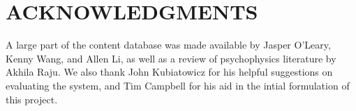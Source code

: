 \documentclass{sigchi}
\begin{document}
  \section{ACKNOWLEDGMENTS}
  A large part of the content database was made available by Jasper O'Leary, Kenny Wang, and Allen Li, as well as a review of psychophysics literature by Akhila Raju. We also thank John Kubiatowicz for his helpful suggestions on evaluating the system, and Tim Campbell for his aid in the intial formulation of this project.  


\end{document}

